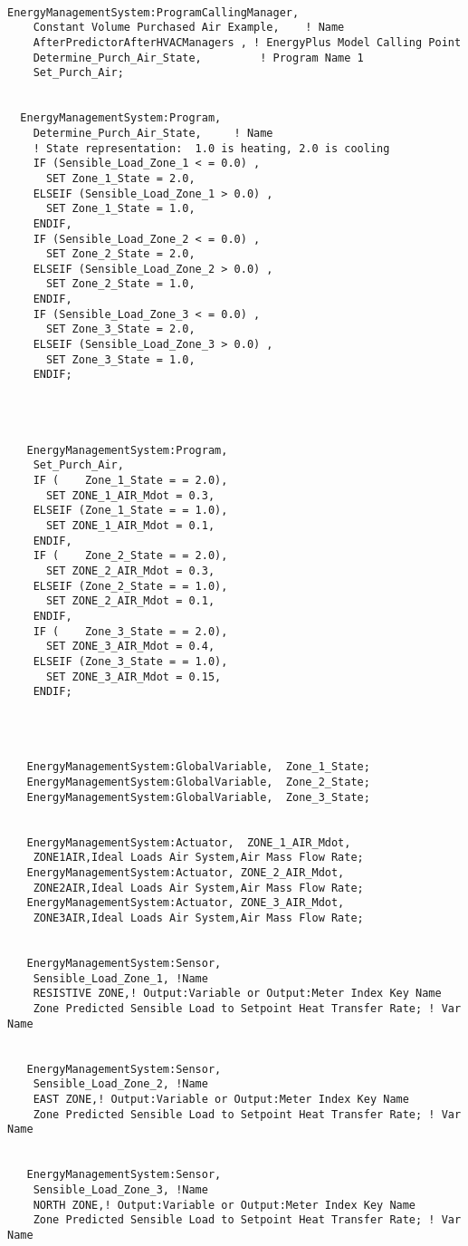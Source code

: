 \begin{lstlisting}

EnergyManagementSystem:ProgramCallingManager,
    Constant Volume Purchased Air Example,    ! Name
    AfterPredictorAfterHVACManagers , ! EnergyPlus Model Calling Point
    Determine_Purch_Air_State,         ! Program Name 1
    Set_Purch_Air;


  EnergyManagementSystem:Program,
    Determine_Purch_Air_State,     ! Name
    ! State representation:  1.0 is heating, 2.0 is cooling
    IF (Sensible_Load_Zone_1 < = 0.0) ,
      SET Zone_1_State = 2.0,
    ELSEIF (Sensible_Load_Zone_1 > 0.0) ,
      SET Zone_1_State = 1.0,
    ENDIF,
    IF (Sensible_Load_Zone_2 < = 0.0) ,
      SET Zone_2_State = 2.0,
    ELSEIF (Sensible_Load_Zone_2 > 0.0) ,
      SET Zone_2_State = 1.0,
    ENDIF,
    IF (Sensible_Load_Zone_3 < = 0.0) ,
      SET Zone_3_State = 2.0,
    ELSEIF (Sensible_Load_Zone_3 > 0.0) ,
      SET Zone_3_State = 1.0,
    ENDIF;




   EnergyManagementSystem:Program,
    Set_Purch_Air,
    IF (    Zone_1_State = = 2.0),
      SET ZONE_1_AIR_Mdot = 0.3,
    ELSEIF (Zone_1_State = = 1.0),
      SET ZONE_1_AIR_Mdot = 0.1,
    ENDIF,
    IF (    Zone_2_State = = 2.0),
      SET ZONE_2_AIR_Mdot = 0.3,
    ELSEIF (Zone_2_State = = 1.0),
      SET ZONE_2_AIR_Mdot = 0.1,
    ENDIF,
    IF (    Zone_3_State = = 2.0),
      SET ZONE_3_AIR_Mdot = 0.4,
    ELSEIF (Zone_3_State = = 1.0),
      SET ZONE_3_AIR_Mdot = 0.15,
    ENDIF;




   EnergyManagementSystem:GlobalVariable,  Zone_1_State;
   EnergyManagementSystem:GlobalVariable,  Zone_2_State;
   EnergyManagementSystem:GlobalVariable,  Zone_3_State;


   EnergyManagementSystem:Actuator,  ZONE_1_AIR_Mdot,
    ZONE1AIR,Ideal Loads Air System,Air Mass Flow Rate;
   EnergyManagementSystem:Actuator, ZONE_2_AIR_Mdot,
    ZONE2AIR,Ideal Loads Air System,Air Mass Flow Rate;
   EnergyManagementSystem:Actuator, ZONE_3_AIR_Mdot,
    ZONE3AIR,Ideal Loads Air System,Air Mass Flow Rate;


   EnergyManagementSystem:Sensor,
    Sensible_Load_Zone_1, !Name
    RESISTIVE ZONE,! Output:Variable or Output:Meter Index Key Name
    Zone Predicted Sensible Load to Setpoint Heat Transfer Rate; ! Var Name


   EnergyManagementSystem:Sensor,
    Sensible_Load_Zone_2, !Name
    EAST ZONE,! Output:Variable or Output:Meter Index Key Name
    Zone Predicted Sensible Load to Setpoint Heat Transfer Rate; ! Var Name


   EnergyManagementSystem:Sensor,
    Sensible_Load_Zone_3, !Name
    NORTH ZONE,! Output:Variable or Output:Meter Index Key Name
    Zone Predicted Sensible Load to Setpoint Heat Transfer Rate; ! Var Name
\end{lstlisting}
